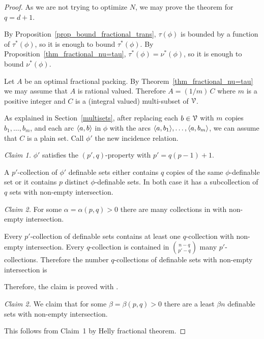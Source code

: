 \documentclass[sputnik.tex]{subfiles}
\begin{document}
\begin{proof}
As we are not trying to optimize $N$, we may prove the theorem for $q=d+1$.

By Proposition~\ref{prop_bound_fractional_trans}, $\tau(\phi)$ is bounded by a function of $\tau^*(\phi)$, so it is enough to bound $\tau^*(\phi)$. By Proposition~\ref{thm_fractional_nu=tau},  $\tau^*(\phi)=\nu^*(\phi)$, so it is enough to bound $\nu^*(\phi)$.

Let $A$ be an optimal fractional packing. By Theorem~\ref{thm_fractional_nu=tau} we may assume that $A$ is rational valued. Therefore $A=(1/m)\,C$ where $m$ is a positive integer and $C$ is a (integral valued) multi-subset of $\EuScript V$. 

As explained in Section~\ref{multisets}, after replacing each $b\in\EuScript V$ with $m$ copies $b_1,\dots,b_m$, and each arc $\langle a,b\rangle$ in $\phi$ with the arcs $\langle a,b_1\rangle,\dots,\langle a,b_m\rangle$, we can assume that $C$ is a plain set. Call $\phi'$ the new incidence relation.

\smallskip
\textit{Claim 1.} $\phi'$ satisfies the $(p',q)$-property with $p'=q(p-1)+1$.

A $p'$-collection of $\phi'$ definable sets either contains $q$ copies of the same $\phi$-definable set or it contains $p$ distinct $\phi$-definable sets. In both case it has a subcollection of $q$ sets with non-empty intersection.

\smallskip
\textit{Claim 2.}
For some $\alpha=\alpha(p,q)>0$ there are  many collections in  with non-empty intersection.

Every $p'$-collection of definable sets contains at least one $q$-collection with non-empty intersection.
Every $q$-collection is contained in ${n-q\choose p'-q}$ many $p'$-collections.
Therefore the number $q$-collections of definable sets with non-empty intersection is


Therefore, the claim is proved with .

\medskip
\textit{Claim 2.}
We claim that for some $\beta=\beta(p,q)>0$ there are a least $\beta n$ definable sets with non-empty intersection.

This follows from Claim~1 by Helly fractional theorem.


\end{proof}
\end{document}

